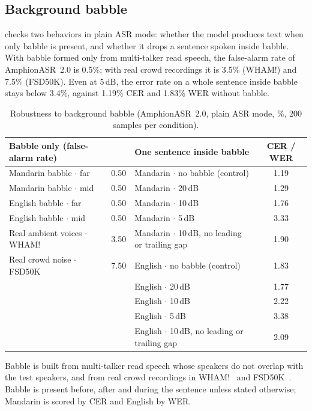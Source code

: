 \subsection{Background babble}
\label{subsec:exp_babble}

 checks two behaviors in plain ASR mode: whether the model produces text when only babble is present, and whether it drops a sentence spoken inside babble.
With babble formed only from multi-talker read speech, the false-alarm rate of AmphionASR~2.0 is 0.5\%; with real crowd recordings it is 3.5\% (WHAM!) and 7.5\% (FSD50K).
Even at 5\,dB, the error rate on a whole sentence inside babble stays below 3.4\%, against 1.19\% CER and 1.83\% WER without babble.

\begin{table}[t]
  \caption{Robustness to background babble (AmphionASR~2.0, plain ASR mode, \%, 200 samples per condition).}
  \label{tab:babble}
  \centering
  \small
  \begin{tabular}{@{}lc@{\hspace{2.2em}}lc@{}}
    \toprule
    Babble only (false-alarm rate) & & One sentence inside babble & CER / WER \\
    \midrule
    Mandarin babble $\cdot$ far & 0.50 & Mandarin $\cdot$ no babble (control) & 1.19 \\
    Mandarin babble $\cdot$ mid & 0.50 & Mandarin $\cdot$ 20\,dB & 1.29 \\
    English babble $\cdot$ far & 0.50 & Mandarin $\cdot$ 10\,dB & 1.76 \\
    English babble $\cdot$ mid & 0.50 & Mandarin $\cdot$ 5\,dB & 3.33 \\
    Real ambient voices $\cdot$ WHAM! & 3.50 & Mandarin $\cdot$ 10\,dB, no leading or trailing gap & 1.90 \\
    Real crowd noise $\cdot$ FSD50K & 7.50 & English $\cdot$ no babble (control) & 1.83 \\
    & & English $\cdot$ 20\,dB & 1.77 \\
    & & English $\cdot$ 10\,dB & 2.22 \\
    & & English $\cdot$ 5\,dB & 3.38 \\
    & & English $\cdot$ 10\,dB, no leading or trailing gap & 2.09 \\
    \bottomrule
  \end{tabular}
  \par\smallskip
  {\footnotesize Babble is built from multi-talker read speech whose speakers do not overlap with the test speakers, and from real crowd recordings in WHAM!~\cite{wichern2019wham} and FSD50K~\cite{fonseca2022fsd50k}. Babble is present before, after and during the sentence unless stated otherwise; Mandarin is scored by CER and English by WER.\par}
\end{table}

